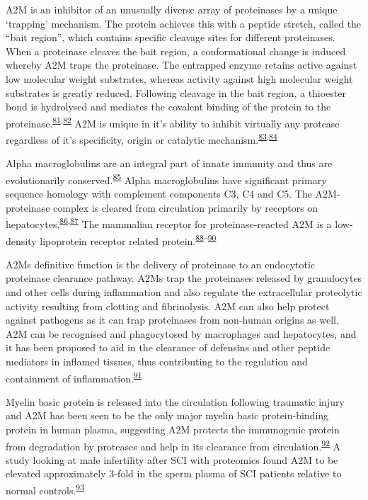 \documentclass[
]{article}
\begin{document}
A2M is an inhibitor of an unusually diverse array of proteinases by a unique `trapping' mechanism.
The protein achieves this with a peptide stretch, called the ``bait region'', which contains specific cleavage sites for different proteinases.
When a proteinase cleaves the bait region, a conformational change is induced whereby A2M traps the proteinase.
The entrapped enzyme retains active against low molecular weight substrates, whereas activity against high molecular weight substrates is greatly reduced.
Following cleavage in the bait region, a thioester bond is hydrolysed and mediates the covalent binding of the protein to the proteinase.\textsuperscript{\protect\hyperlink{ref-hall_proteolytic_1981}{81},\protect\hyperlink{ref-sottrup-jensen_primary_1984}{82}}
A2M is unique in it's ability to inhibit virtually any protease regardless of it's specificity, origin or catalytic mechanism.\textsuperscript{\protect\hyperlink{ref-khan_oxidized_2004}{83},\protect\hyperlink{ref-lin_n-glycosylation_2012}{84}}

Alpha macroglobulins are an integral part of innate immunity and thus are evolutionarily conserved.\textsuperscript{\protect\hyperlink{ref-buresova_iram2-macroglobulin_2009}{85}}
Alpha macroglobulins have significant primary sequence homology with complement components C3, C4 and C5.
The A2M-proteinase complex is cleared from circulation primarily by receptors on hepatocytes.\textsuperscript{\protect\hyperlink{ref-bond_incorporation_2007}{86},\protect\hyperlink{ref-travis_human_1983}{87}}
The mammalian receptor for proteinase‐reacted A2M is a low‐density lipoprotein receptor related protein.\textsuperscript{\protect\hyperlink{ref-fujiyoshi_amyloid-_2011}{88}--\protect\hyperlink{ref-wyatt_acute_2013}{90}}

A2Ms definitive function is the delivery of proteinase to an endocytotic proteinase clearance pathway.
A2Ms trap the proteinases released by granulocytes and other cells during inflammation and also regulate the extracellular proteolytic activity resulting from clotting and fibrinolysis.
A2M can also help protect against pathogens as it can trap proteinases from non-human origins as well.
A2M can be recognised and phagocytosed by macrophages and hepatocytes, and it has been proposed to aid in the clearance of defensins and other peptide mediators in inflamed tissues, thus contributing to the regulation and containment of inflammation.\textsuperscript{\protect\hyperlink{ref-rehman_alpha-2-macroglobulin_2013}{91}}

Myelin basic protein is released into the circulation following traumatic injury and A2M has been seen to be the only major myelin basic protein-binding protein in human plasma, suggesting A2M protects the immunogenic protein from degradation by proteases and help in its clearance from circulation.\textsuperscript{\protect\hyperlink{ref-gunnarsson_binding_1998}{92}}
A study looking at male infertility after SCI with proteomics found A2M to be elevated approximately 3-fold in the sperm plasma of SCI patients relative to normal controls.\textsuperscript{\protect\hyperlink{ref-silva_towards_2016}{93}}
\end{document}

